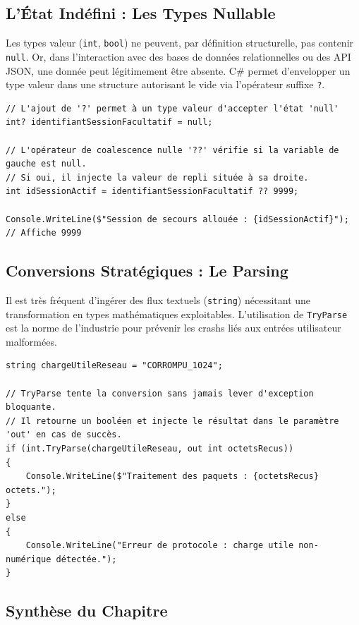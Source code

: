 \subsection{L'État Indéfini : Les Types Nullable}

Les types valeur (\texttt{int}, \texttt{bool}) ne peuvent, par définition structurelle, pas contenir \texttt{null}. Or, dans l'interaction avec des bases de données relationnelles ou des API JSON, une donnée peut légitimement être absente. 
C\# permet d'envelopper un type valeur dans une structure autorisant le vide via l'opérateur suffixe \texttt{?}.

\begin{lstlisting}[caption={Types nullable et opérateur de coalescence}]
// L'ajout de '?' permet à un type valeur d'accepter l'état 'null'
int? identifiantSessionFacultatif = null;

// L'opérateur de coalescence nulle '??' vérifie si la variable de gauche est null.
// Si oui, il injecte la valeur de repli située à sa droite.
int idSessionActif = identifiantSessionFacultatif ?? 9999;

Console.WriteLine($"Session de secours allouée : {idSessionActif}"); // Affiche 9999
\end{lstlisting}

\subsection{Conversions Stratégiques : Le Parsing}

Il est très fréquent d'ingérer des flux textuels (\texttt{string}) nécessitant une transformation en types mathématiques exploitables. L'utilisation de \texttt{TryParse} est la norme de l'industrie pour prévenir les crashs liés aux entrées utilisateur malformées.

\begin{lstlisting}[caption={Conversion sécurisée via TryParse}]
string chargeUtileReseau = "CORROMPU_1024";

// TryParse tente la conversion sans jamais lever d'exception bloquante.
// Il retourne un booléen et injecte le résultat dans le paramètre 'out' en cas de succès.
if (int.TryParse(chargeUtileReseau, out int octetsRecus))
{
    Console.WriteLine($"Traitement des paquets : {octetsRecus} octets.");
}
else
{
    Console.WriteLine("Erreur de protocole : charge utile non-numérique détectée.");
}
\end{lstlisting}

\subsection{Synthèse du Chapitre}

